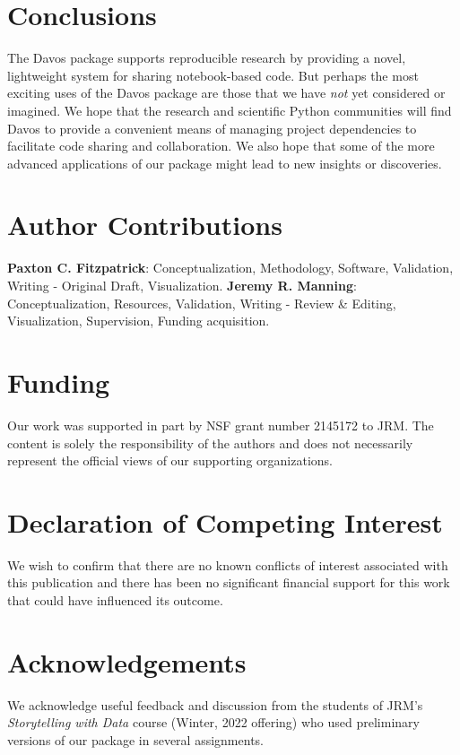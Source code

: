 \documentclass[preprint,12pt,a4paper]{elsarticle}
\begin{document}
\section{Conclusions}

The Davos package supports reproducible research by providing
a novel, lightweight system for sharing notebook-based code. But
perhaps the most exciting uses of the Davos package are those
that we have \textit{not} yet considered or imagined. We hope that the
research and scientific Python communities will find Davos to provide a convenient
means of managing project dependencies to facilitate code sharing and collaboration. We
also hope that some of the more advanced applications of our package
might lead to new insights or discoveries.


\section*{Author Contributions}

\textbf{Paxton C. Fitzpatrick}: Conceptualization, Methodology,
Software, Validation, Writing - Original Draft,
Visualization. \textbf{Jeremy R. Manning}: Conceptualization,
Resources, Validation, Writing - Review \& Editing, Visualization, Supervision,
Funding acquisition.

\section*{Funding}

Our work was supported in part by NSF grant number 2145172 to JRM.
The content is solely the responsibility of the authors and does not
necessarily represent the official views of our supporting
organizations.


\section*{Declaration of Competing Interest}

We wish to confirm that there are no known conflicts of interest
associated with this publication and there has been no significant
financial support for this work that could have influenced its
outcome.


\section*{Acknowledgements}

We acknowledge useful feedback and discussion from the students of
JRM's \textit{Storytelling with Data} course (Winter, 2022 offering)
who used preliminary versions of our package in several assignments.



\end{document}
